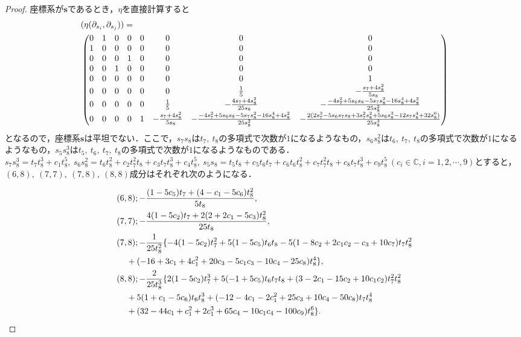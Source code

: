 \documentclass[a4paper,11pt]{jbook}
\theoremstyle{plain}
\theoremstyle{definition}
\theoremstyle{remark}
\theoremstyle{proof}
\numberwithin{equation}{section}
\def\CC{{\mathbb C}}
\begin{document}
\begin{proof}
座標系が$\bm{s}$であるとき，$\eta$を直接計算すると
\begin{align}
&(\eta(\partial_{s_i},\partial_{s_j}))= \notag \\
&\begin{pmatrix}
0&1&0&0&0&0&0&0\\
1&0&0&0&0&0&0&0\\
0&0&0&1&0&0&0&0\\
0&0&1&0&0&0&0&0\\
0&0&0&0&0&0&0&1\\
0&0&0&0&0&0&\frac{1}{5}&-\frac{s_7+4s_8^2}{5s_8}\\
0&0&0&0&0&\frac{1}{5}&-\frac{4s_7+4s_8^2}{25s_8}&-\frac{-4s_7^2+5s_6s_8-5s_7s_8^2-16s_8^4+4s_8^2}{25s_8^2}\\
0&0&0&0&1&-\frac{s_7+4s_8^2}{5s_8}&-\frac{-4s_7^2+5s_6s_8-5s_7s_8^2-16s_8^4+4s_8^2}{25s_8^2}&-\frac{2(2s_7^3-5s_6s_7s_8+3s_7^2s_8^2+5s_6s_8^3-12s_7s_8^4+32s_8^6)}{25s_8^3}
\end{pmatrix}
\end{align}
となるので，座標系$\bm{s}$は平坦でない．ここで，$s_7s_8$は$t_7, \ t_8$の多項式で次数が$1$になるようなもの，$s_6s_8^2$は$t_6, \ t_7, \ t_8$の多項式で次数が$1$になるようなもの，$s_5s_8^3$は$t_5, \ t_6, \ t_7, \ t_8$の多項式で次数が$1$になるようなものである．$s_7s_8^3=t_7t_8^3+c_1t_8^5, \ s_6s_8^2=t_6t_8^2 + c_2t_7^2t_8 +c_3t_7t_8^3 + c_4t_8^5, \ s_5s_8=t_5t_8+c_5t_6t_7+c_6t_6t_8^2+c_7t_7^2t_8+c_8t_7t_8^3+c_9t_8^5\ (c_i \in \CC, i=1,2,\cdots, 9)$とすると，$(6,8), \ (7,7), \ (7,8), \ (8,8)$成分はそれぞれ次のようになる．

\begin{align}
&(6,8) ; -\frac{(1-5c_5)t_7+(4-c_1-5c_6)t_8^2}{5t_8}, \notag \\
&(7,7) ; -\frac{4(1-5c_2)t_7 + 2(2+2c_1-5c_3)t_8^2}{25t_8},  \notag \\
&(7,8) ; -\frac{1}{25t_8^2}\{-4(1-5c_2)t_7^2+5(1-5c_5)t_6t_8-5(1-8c_2+2c_1c_2-c_3+10c_7)t_7t_8^2 \notag \\ 
	&\,\,\,\,\,\,\,+(-16+3c_1+4c_1^2+20c_3-5c_1c_3-10c_4-25c_8)t_8^4\},  \notag \\
&(8,8) ; -\frac{2}{25t_8^3}\{ 2(1-5c_2)t_7^3 +5(-1+5c_5)t_6t_7t_8 +(3-2c_1-15c_2+10c_1c_2)t_7^2t_8^2 \notag \\
	&\,\,\,\,\,\,\, +5(1+c_1-5c_6)t_6t_8^3 +(-12-4c_1-2c_1^2+25c_3+10c_4-50c_8)t_7t_8^4 \notag \\
	&\,\,\,\,\,\,\, +(32-44c_1+c_1^2+2c_1^3+65c_4-10c_1c_4-100c_9)t_8^6 \}. \notag
\end{align}


\end{proof}
\end{document}
